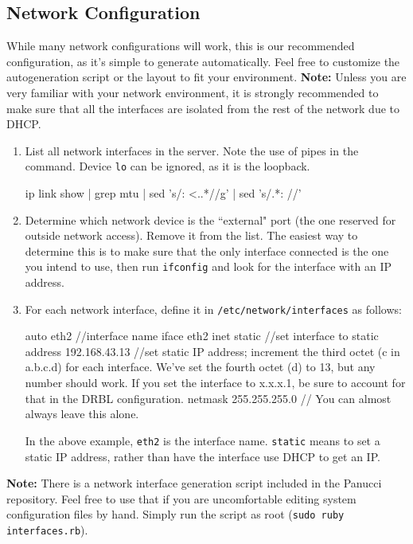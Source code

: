 \documentclass{article}
\def\code#1{\texttt{#1}}
\begin{document}
\begin{flushleft}
\subsection{Network Configuration}
While many network configurations will work, this is our recommended configuration, as it's simple to generate automatically.  Feel free to customize the autogeneration script or the layout to fit your environment.\linebreak
\textbf{Note:} Unless you are very familiar with your network environment, it is strongly recommended to make sure that all the interfaces are isolated from the rest of the network due to DHCP.
\begin{enumerate}
  \item List all network interfaces in the server.  Note the use of pipes in the command.  Device \code{lo} can be ignored, as it is the loopback.
  \begin{spverbatim}
ip link show | grep mtu | sed 's/: <..*//g' | sed 's/.*: //'
  \end{spverbatim}
  \item Determine which network device is the ``external" port (the one reserved for outside network access).  Remove it from the list.  The easiest way to determine this is to make sure that the only interface connected is the one you intend to use, then run \code{ifconfig} and look for the interface with an IP address.
  \item For each network interface, define it in \code{/etc/network/interfaces} as follows:
  \begin{spverbatim}
auto eth2 //interface name
iface eth2 inet static //set interface to static
address 192.168.43.13 //set static IP address; increment the third octet (c in a.b.c.d) for each interface.  We've set the fourth octet (d) to 13, but any number should work.  If you set the interface to x.x.x.1, be sure to account for that in the DRBL configuration.
netmask 255.255.255.0 // You can almost always leave this alone.
  \end{spverbatim}\linebreak
In the above example, \code{eth2} is the interface name.  \code{static} means to set a static IP address, rather than have the interface use DHCP to get an IP.
\end{enumerate}
\textbf{Note:} There is a network interface generation script included in the Panucci repository.  Feel free to use that if you are uncomfortable editing system configuration files by hand.  Simply run the script as root (\code{sudo ruby interfaces.rb}).

\end{flushleft}
\end{document}
